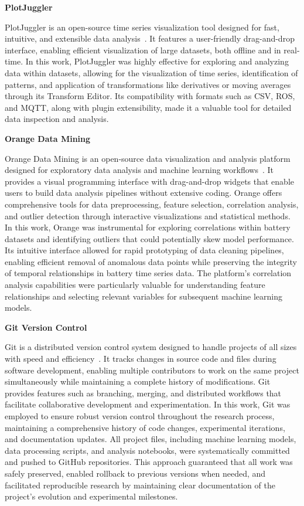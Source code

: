 \textbf{PlotJuggler}

PlotJuggler is an open-source time series visualization tool designed for fast, intuitive, and extensible data analysis~\cite{faconti_facontidavideplotjuggler_2025}. It features a user-friendly drag-and-drop interface, enabling efficient visualization of large datasets, both offline and in real-time. In this work, PlotJuggler was highly effective for exploring and analyzing data within datasets, allowing for the visualization of time series, identification of patterns, and application of transformations like derivatives or moving averages through its Transform Editor. Its compatibility with formats such as CSV, ROS, and MQTT, along with plugin extensibility, made it a valuable tool for detailed data inspection and analysis.

\textbf{Orange Data Mining}

Orange Data Mining is an open-source data visualization and analysis platform designed for exploratory data analysis and machine learning workflows~\cite{noauthor_biolaborange3_nodate}. It provides a visual programming interface with drag-and-drop widgets that enable users to build data analysis pipelines without extensive coding. Orange offers comprehensive tools for data preprocessing, feature selection, correlation analysis, and outlier detection through interactive visualizations and statistical methods. In this work, Orange was instrumental for exploring correlations within battery datasets and identifying outliers that could potentially skew model performance. Its intuitive interface allowed for rapid prototyping of data cleaning pipelines, enabling efficient removal of anomalous data points while preserving the integrity of temporal relationships in battery time series data. The platform's correlation analysis capabilities were particularly valuable for understanding feature relationships and selecting relevant variables for subsequent machine learning models.

\textbf{Git Version Control}

Git is a distributed version control system designed to handle projects of all sizes with speed and efficiency~\cite{noauthor_git_nodate}. It tracks changes in source code and files during software development, enabling multiple contributors to work on the same project simultaneously while maintaining a complete history of modifications. Git provides features such as branching, merging, and distributed workflows that facilitate collaborative development and experimentation. In this work, Git was employed to ensure robust version control throughout the research process, maintaining a comprehensive history of code changes, experimental iterations, and documentation updates. All project files, including machine learning models, data processing scripts, and analysis notebooks, were systematically committed and pushed to GitHub repositories. This approach guaranteed that all work was safely preserved, enabled rollback to previous versions when needed, and facilitated reproducible research by maintaining clear documentation of the project's evolution and experimental milestones.

